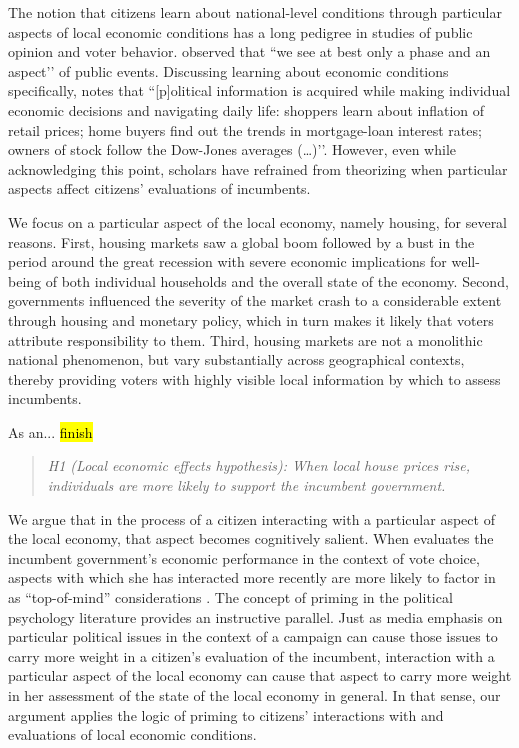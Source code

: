 \documentclass[12pt,a4paper]{article}
\begin{document}
	The notion that citizens learn about national-level conditions through particular aspects of local economic conditions has a long pedigree in studies of public opinion and voter behavior. \cite[][p. 79]{lippmann1946public} observed that ``we see at best only a phase and an aspect’’ of public events. Discussing learning about economic conditions specifically, \cite[][p. 24]{popkin1994reasoning} notes that ``[p]olitical information is acquired while making individual economic decisions and navigating daily life: shoppers learn about inflation of retail prices; home buyers find out the trends in mortgage-loan interest rates; owners of stock follow the Dow-Jones averages (…)’’\cite[see also][p. 5]{fiorina1981retrospective}. However, even while acknowledging this point, scholars have refrained from theorizing when particular aspects affect citizens’ evaluations of incumbents.
		
	 We focus on a particular aspect of the local economy, namely housing, for several reasons. First, housing markets saw a global boom followed by a bust in the period around the great recession with severe economic implications for well-being of both individual households and the overall state of the economy. Second, governments influenced the severity of the market crash to a considerable extent through housing and monetary policy, which in turn makes it likely that voters attribute responsibility to them. Third, housing markets are not a monolithic national phenomenon, but vary substantially across geographical contexts, thereby providing voters with highly visible local information by which to assess incumbents. 

	As an... \hl{finish}

	\begin{quote}
		\textit{H1 (Local economic effects hypothesis): When local house prices rise, individuals are more likely to support the incumbent government.}
	\end{quote}

	
	We argue that in the process of a citizen interacting with a particular aspect of the local economy, that aspect becomes cognitively salient. When evaluates the incumbent government’s economic performance in the context of vote choice, aspects with which she has interacted more recently are more likely to factor in as “top-of-mind” considerations \cite{zaller1992nature}. The concept of priming in the political psychology literature provides an instructive parallel. Just as media emphasis on particular political issues in the context of a campaign can cause those issues to carry more weight in a citizen’s evaluation of the incumbent, interaction with a particular aspect of the local economy can cause that aspect to carry more weight in her assessment of the state of the local economy in general. In that sense, our argument applies the logic of priming to citizens’ interactions with and evaluations of local economic conditions.
	
\end{document}
